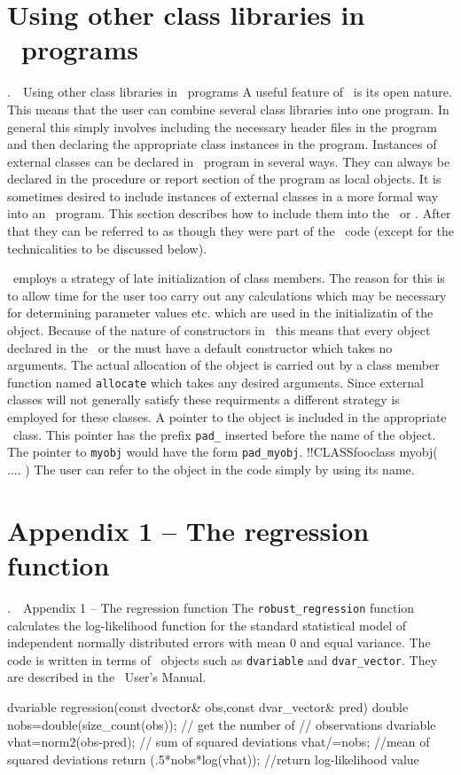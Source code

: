 \documentclass[12pt]{book}
\makeatletter
\def\mysection#1{\section{#1}{\bigbf \medbreak\noindent\number\c@chapter.\number\c@section\ \ #1\medbreak}}
\makeatother
\begin{document}
\mysection{Using other class libraries in \ADM\ programs}
A useful feature of \cplus\ is its open nature.  This means that the user
can combine several class libraries into one program. In general this simply
involves including the necessary header files in the program and then
declaring the appropriate class instances in the program.
Instances of external classes can be declared in \ADM\ program in several ways.
They can always be declared in the procedure or report section 
of the program as local objects. It is sometimes desired to include instances
of external classes in a more formal way into an \ADM\ program. 
This section describes how to include them into the \DS\ or \PS.
After that they can be referred to as though they were part of the 
\ADM\ code (except for the technicalities to be discussed below).
 
\ADM\ employs a strategy of late initialization of class members. The reason for
this is to allow time for the user too carry out any calculations which
may be necessary for determining parameter values etc. which are used
in the initializatin of the object. Because of the nature of constructors in
\cplus\ this means that every object declared in the \DS\ or the \PS
must have a default constructor which takes no arguments. The actual
allocation of the object is carried out by a class member function 
named {\tt allocate} which takes any desired arguments.
Since external classes will not generally satisfy these requirments
a different strategy is employed  for these classes. 
A pointer to the object is included in the 
appropriate \ADM\ class. This pointer has the prefix {\tt pad\_} inserted before
the name of the object. The pointer to {\tt myobj} would have
the form {\tt pad\_myobj}. 
\beginexample
 !!CLASSfooclass myobj( .... )
\endexample
The user can refer to the object in the code simply by using its name.

\mysection{Appendix 1 -- The regression function}
The {\tt robust\_regression} function calculates the log-likelihood function
for the standard statistical model of independent
normally distributed errors with mean 0 and equal variance.
The code is written in terms of \AD\ objects such as
{\tt dvariable} and {\tt dvar\_vector}. They are
described in the \AD\ User's Manual.

\beginexample
dvariable regression(const dvector& obs,const dvar_vector& pred)
{
  double nobs=double(size_count(obs));  // get the number of
                                        // observations
  dvariable vhat=norm2(obs-pred);  // sum of squared deviations
  vhat/=nobs;                      //mean of squared deviations
  return (.5*nobs*log(vhat));     //return log-likelihood value
}
\endexample
\end{document}
